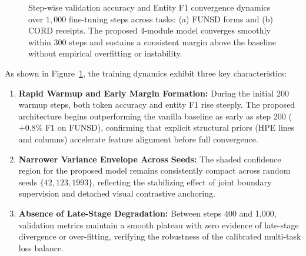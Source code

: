 \begin{figure}[htbp]
{%
}
\caption{Step-wise validation accuracy and Entity F1 convergence dynamics over $1,000$ fine-tuning steps across tasks: (a) FUNSD forms and (b) CORD receipts. The proposed 4-module model converges smoothly within 300 steps and sustains a consistent margin above the baseline without empirical overfitting or instability.}
\label{fig:convergence_accuracy_dynamics}
\end{figure}

As shown in Figure~\ref{fig:convergence_accuracy_dynamics}, the training dynamics exhibit three key characteristics:
\begin{enumerate}[leftmargin=*]
    \item \textbf{Rapid Warmup and Early Margin Formation:}
    During the initial 200 warmup steps, both token accuracy and entity F1 rise steeply. The proposed architecture begins outperforming the vanilla baseline as early as step 200 ($+0.8\%$ F1 on FUNSD), confirming that explicit structural priors (HPE lines and columns) accelerate feature alignment before full convergence.
    \item \textbf{Narrower Variance Envelope Across Seeds:}
    The shaded confidence region for the proposed model remains consistently compact across random seeds $\{42, 123, 1993\}$, reflecting the stabilizing effect of joint boundary supervision and detached visual contrastive anchoring.
    \item \textbf{Absence of Late-Stage Degradation:}
    Between steps 400 and 1,000, validation metrics maintain a smooth plateau with zero evidence of late-stage divergence or over-fitting, verifying the robustness of the calibrated multi-task loss balance.
\end{enumerate}
